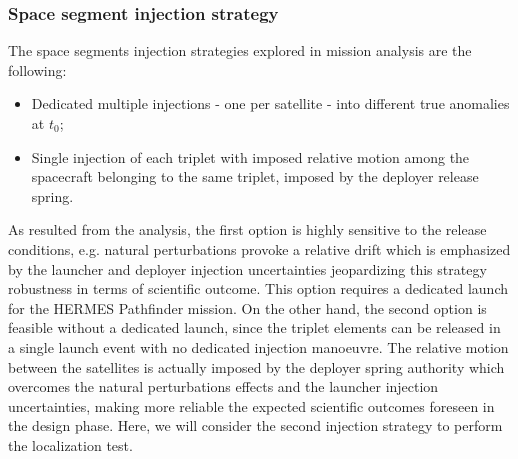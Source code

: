 \documentclass[]{spie}  %
\begin{document}
\subsubsection{Space segment injection strategy}
The space segments injection strategies explored in mission analysis are the following:
\begin{itemize}
\item Dedicated multiple injections - one per satellite - into different true anomalies at $t_0$; 
\item Single injection of each triplet with imposed relative motion among the spacecraft belonging to the same triplet, imposed by the deployer release spring.
\end{itemize} 

As resulted from the analysis, the first option is highly sensitive to the release conditions, e.g. natural perturbations provoke a relative drift which is emphasized by the launcher and deployer injection uncertainties jeopardizing this strategy robustness in terms of scientific outcome. This option requires a dedicated launch for the HERMES Pathfinder mission. 
On the other hand, the second option is feasible without a dedicated launch, since the triplet elements can be released in a single launch event with no dedicated injection manoeuvre. The relative motion between the satellites is actually imposed by the deployer spring authority which overcomes the natural perturbations effects and the launcher injection uncertainties, making more reliable the expected scientific outcomes foreseen in the design phase. 
Here, we will consider the second injection strategy to perform the localization test.
\end{document}

